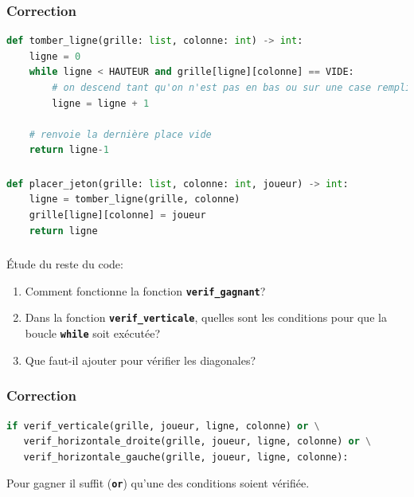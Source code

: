 \documentclass[svgnames,11pt]{beamer}
\begin{document}
\begin{frame}[fragile]
    \frametitle{Correction}

\begin{center}
\begin{lstlisting}[language=Python , basicstyle=\ttfamily\small, xleftmargin=.5em, xrightmargin=-5em]
def tomber_ligne(grille: list, colonne: int) -> int:
    ligne = 0
    while ligne < HAUTEUR and grille[ligne][colonne] == VIDE:
        # on descend tant qu'on n'est pas en bas ou sur une case remplie
        ligne = ligne + 1

    # renvoie la dernière place vide
    return ligne-1
\end{lstlisting}
\label{CODE}
\end{center}    

\end{frame}
\begin{frame}[fragile]
    \frametitle{}

\begin{center}
\begin{lstlisting}[language=Python , basicstyle=\ttfamily\small, xleftmargin=.5em, xrightmargin=-4.5em]
def placer_jeton(grille: list, colonne: int, joueur) -> int:
    ligne = tomber_ligne(grille, colonne)
    grille[ligne][colonne] = joueur
    return ligne
\end{lstlisting}
\label{CODE}
\end{center}   

\end{frame}
\begin{frame}
    \frametitle{}

\begin{activite}
Étude du reste du code:
\begin{enumerate}
    \item Comment fonctionne la fonction \textbf{\texttt{verif\_gagnant}}?
    \item Dans la fonction \textbf{\texttt{verif\_verticale}}, quelles sont les conditions pour que la boucle \textbf{\texttt{while}} soit exécutée?
    \item Que faut-il ajouter pour vérifier les diagonales?
\end{enumerate}
\end{activite}

\end{frame}
\begin{frame}[fragile]
    \frametitle{Correction}

    \begin{center}
    \begin{lstlisting}[language=Python , basicstyle=\ttfamily\small, xleftmargin=.3em, xrightmargin=-6.3em]
if verif_verticale(grille, joueur, ligne, colonne) or \
   verif_horizontale_droite(grille, joueur, ligne, colonne) or \
   verif_horizontale_gauche(grille, joueur, ligne, colonne):
\end{lstlisting}
    \captionof{code}{Gagnant?}
    \label{CODE}
    \end{center}
Pour gagner il suffit (\textbf{\texttt{or}}) qu'une des conditions soient vérifiée.
\end{frame}
\end{document}
